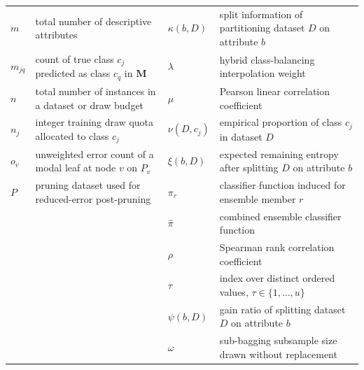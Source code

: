 \begin{table}[!ht]
\begin{tabular}{lp{6.8cm}lp{6.8cm}}
$m$               & total number of descriptive attributes & $\kappa(b, D)$  & split information of partitioning dataset $D$ on attribute $b$ \\
$m_{jq}$          & count of true class $c_j$ predicted as class $c_q$ in $\mathbf{M}$ & $\lambda$       & hybrid class-balancing interpolation weight \\
$n$               & total number of instances in a dataset or draw budget & $\mu$           & Pearson linear correlation coefficient \\
$n_j$             & integer training draw quota allocated to class $c_j$ & $\nu(D, c_j)$   & empirical proportion of class $c_j$ in dataset $D$ \\
$o_v$             & unweighted error count of a modal leaf at node $v$ on $P_v$ & $\xi(b, D)$     & expected remaining entropy after splitting $D$ on attribute $b$ \\
$P$               & pruning dataset used for reduced-error post-pruning & $\pi_r$         & classifier function induced for ensemble member $r$ \\
 & & $\hat{\pi}$     & combined ensemble classifier function \\
 & & $\rho$          & Spearman rank correlation coefficient \\
 & & $\tau$          & index over distinct ordered values, $\tau \in \{1, \dots, u\}$ \\
 & & $\psi(b, D)$    & gain ratio of splitting dataset $D$ on attribute $b$ \\
 & & $\omega$        & sub-bagging subsample size drawn without replacement \\
\bottomrule
\end{tabular}
\end{table}

